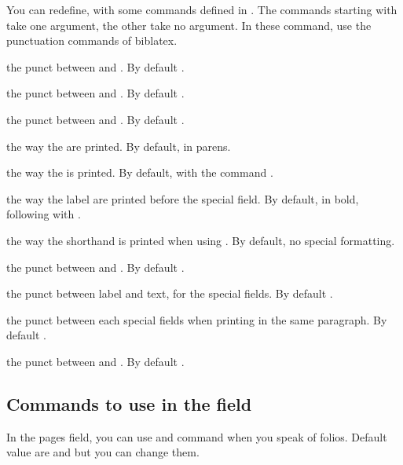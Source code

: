 \documentclass{ltxdockit}[2011/03/25]
\newcommand{\biblatex}{biblatex\xspace}
\begin{document}
You can redefine, with  some commands defined in . The commands starting with  take one argument, the other take no argument. In these command, use the punctuation commands of \biblatex.

\begin{ltxsyntax}
 the punct between  and . By default .

 the punct between  and . By default .

 the punct between  and . By default .

 the way the  are printed. By default, in parens.

 the way the  is printed. By default, with the command .

 the way the label are printed before the special field. By default, in bold, following with .

 the way the shorthand is printed when using . By default, no special formatting.

 the punct between  and .  By default .

 the punct between label and text, for the special fields. By default .

 the punct between each special fields when printing in the same paragraph. By default .

 the punct between  and . By default .
\end{ltxsyntax}

\subsection{Commands to use in the  field}

In the pages field, you can use  and  command when you speak of folios. Default value are  and  but you can change them.
\end{document}
